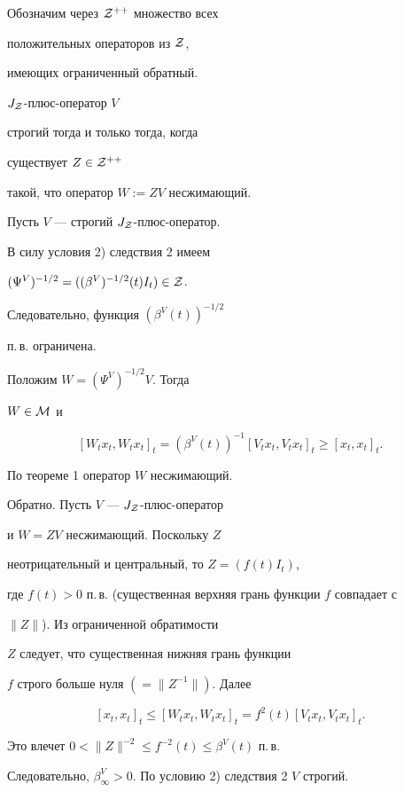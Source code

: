 Обозначим через ${\cal Z}^{++}$ множество всех


положительных операторов из ${\cal Z}$,


имеющих ограниченный обратный.





\begin{thm}


$J_{\cal Z}$-плюс-оператор $V$


строгий тогда и только тогда, когда


существует $Z\in {\cal Z}^{++}$


такой, что оператор $W:=ZV$ несжимающий.


\end{thm}





\begin{pf}


Пусть $V$ --- строгий $J_{\cal Z}$-плюс-оператор.


В силу условия 2) следствия 2 имеем 


$(\Psi^{V})^{-1/2}=((\beta^{V})^{-1/2}(t)I_{t})\in\cal Z$.


Следовательно, функция $(\beta^{V}(t))^{-1/2}$


п.\,в. ограничена.


Положим $W=(\Psi^{V})^{-1/2}V$. Тогда


$W\in {\cal M}$ и


$$


[W_{t}x_{t},W_{t}x_{t}]_{t}=


(\beta^{V}(t))^{-1}[V_{t}x_{t},V_{t}x_{t}]_{t}\geq [x_{t},x_{t}]_{t}.


$$


По теореме 1 оператор $W$ несжимающий.





Обратно. Пусть $V$ --- $J_{\cal Z}$-плюс-оператор


и $W=ZV$ несжимающий. Поскольку $Z$


неотрицательный и центральный, то $Z=(f(t)I_{t})$,


где $f(t)> 0$ п.\,в. (существенная верхняя грань функции $f$ совпадает с


$\| Z\|$). Из ограниченной обратимости


$Z$ следует, что существенная нижняя грань функции


$f$ строго больше нуля $(=\| Z^{-1}\|)$. Далее


$$


[x_{t},x_{t}]_{t}\leq [W_{t}x_{t},W_{t}x_{t}]_{t}


=f^{2}(t)[V_{t}x_{t},V_{t}x_{t}]_{t}.


$$


Это влечет $0<\| Z\|^{-2}\leq f^{-2}(t)\leq\beta^{V}(t)$ п.\,в.


Следовательно, $\beta^{V}_{\infty}>0$. По условию 2) следствия 2 $V$ строгий.


\end{pf}





